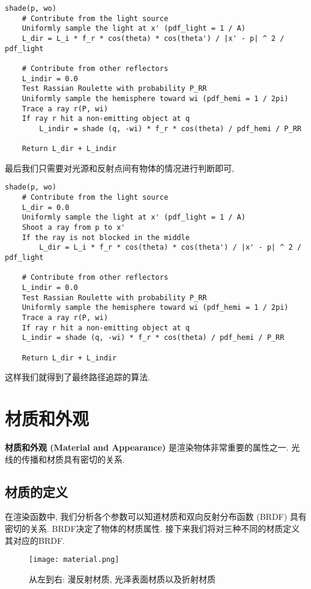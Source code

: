\begin{lstlisting}[caption=采用光源上均匀分布渲染函数伪代码]
shade(p, wo)
	# Contribute from the light source
	Uniformly sample the light at x' (pdf_light = 1 / A)
	L_dir = L_i * f_r * cos(theta) * cos(theta') / |x' - p| ^ 2 / pdf_light
	
	# Contribute from other reflectors
	L_indir = 0.0
	Test Rassian Roulette with probability P_RR
	Uniformly sample the hemisphere toward wi (pdf_hemi = 1 / 2pi)
	Trace a ray r(P, wi)
	If ray r hit a non-emitting object at q
		L_indir = shade (q, -wi) * f_r * cos(theta) / pdf_hemi / P_RR
	
	Return L_dir + L_indir
\end{lstlisting}

最后我们只需要对光源和反射点间有物体的情况进行判断即可, 

\begin{lstlisting}[caption=渲染函数伪代码]
	shade(p, wo)
	# Contribute from the light source
	L_dir = 0.0
	Uniformly sample the light at x' (pdf_light = 1 / A)
	Shoot a ray from p to x'
	If the ray is not blocked in the middle
		L_dir = L_i * f_r * cos(theta) * cos(theta') / |x' - p| ^ 2 / pdf_light
	
	# Contribute from other reflectors
	L_indir = 0.0
	Test Rassian Roulette with probability P_RR
	Uniformly sample the hemisphere toward wi (pdf_hemi = 1 / 2pi)
	Trace a ray r(P, wi)
	If ray r hit a non-emitting object at q
	L_indir = shade (q, -wi) * f_r * cos(theta) / pdf_hemi / P_RR
	
	Return L_dir + L_indir
\end{lstlisting}

这样我们就得到了最终路径追踪的算法. 


\chapter{材质和外观}

\textbf{材质和外观 (Material and Appearance) }是渲染物体非常重要的属性之一. 光线的传播和材质具有密切的关系. 

\section{材质的定义}

在渲染函数中, 我们分析各个参数可以知道材质和双向反射分布函数 (BRDF) 具有密切的关系. BRDF决定了物体的材质属性. 接下来我们将对三种不同的材质定义其对应的BRDF. 

\begin{figure}[H]
	\centering
	\texttt{[image: material.png]}
	\caption{从左到右: 漫反射材质, 光泽表面材质以及折射材质}
	\label{fig:material}
\end{figure}

